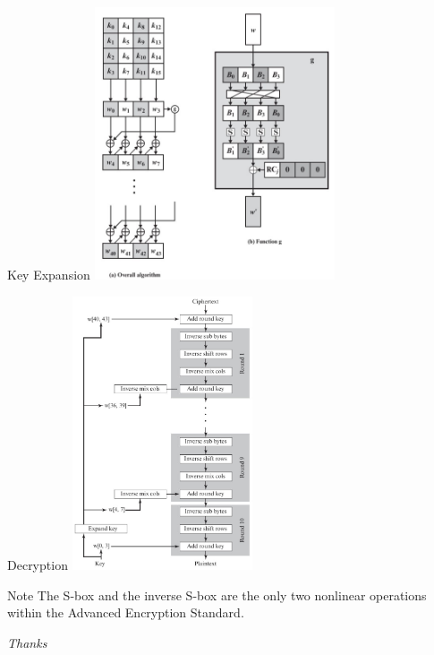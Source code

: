 \documentclass{beamer}
\begin{document}
\begin{frame}{Key Expansion}
	\includegraphics[width=2.8in]{fig/clip_image020.jpg}
\end{frame}

\begin{frame}{Decryption}
	\includegraphics[width=2.1in]{fig/clip_image022.jpg}

\end{frame}

\begin{frame}{Note}
	The S-box and the inverse S-box are the only two nonlinear operations
	within the Advanced Encryption Standard.
\end{frame}

\begin{frame}
	\centering \Large
	\emph{Thanks}
\end{frame}
\end{document}
